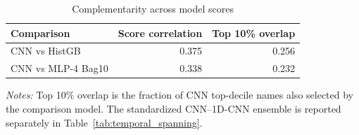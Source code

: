 \begin{table}[htbp]
\centering
\caption{Complementarity across model scores}
\label{tab:complementarity}
\begin{tabular}{lrr}
\toprule
Comparison & Score correlation & Top 10\% overlap \\
\midrule
CNN vs HistGB & 0.375 & 0.256 \\
CNN vs MLP-4 Bag10 & 0.338 & 0.232 \\
\bottomrule
\end{tabular}
\begin{minipage}{0.92\linewidth}
\footnotesize
\textit{Notes:} Top 10\% overlap is the fraction of CNN top-decile names also selected by the comparison model. The standardized CNN--1D-CNN ensemble is reported separately in Table~\ref{tab:temporal_spanning}.
\end{minipage}
\end{table}
